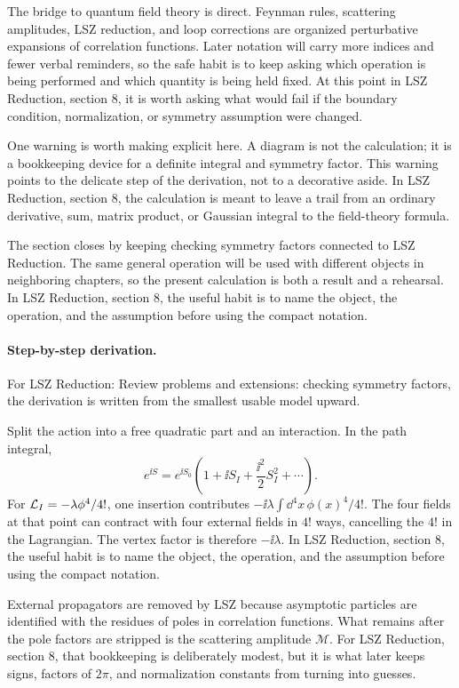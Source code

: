 The bridge to quantum field theory is direct.  Feynman rules, scattering amplitudes, LSZ reduction, and loop corrections are organized perturbative expansions of correlation functions.  Later notation will carry more indices and fewer verbal reminders, so the safe habit is to keep asking which operation is being performed and which quantity is being held fixed.  At this point in LSZ Reduction, section 8, it is worth asking what would fail if the boundary condition, normalization, or symmetry assumption were changed.

One warning is worth making explicit here.  A diagram is not the calculation; it is a bookkeeping device for a definite integral and symmetry factor.  This warning points to the delicate step of the derivation, not to a decorative aside.  In LSZ Reduction, section 8, the calculation is meant to leave a trail from an ordinary derivative, sum, matrix product, or Gaussian integral to the field-theory formula.

The section closes by keeping checking symmetry factors connected to LSZ Reduction.  The same general operation will be used with different objects in neighboring chapters, so the present calculation is both a result and a rehearsal.  In LSZ Reduction, section 8, the useful habit is to name the object, the operation, and the assumption before using the compact notation.



\paragraph{Step-by-step derivation.}

For LSZ Reduction: Review problems and extensions: checking symmetry factors, the derivation is written from the smallest usable model upward.

Split the action into a free quadratic part and an interaction.  In the path integral,
\[
  e^{\ii S}=e^{\ii S_0}\left(1+\ii S_I+\frac{\ii^2}{2}S_I^2+\cdots\right).
\]
For \(\mathcal L_I=-\lambda\phi^4/4!\), one insertion contributes \(-\ii\lambda\int\dd^4x\,\phi(x)^4/4!\).  The four fields at that point can contract with four external fields in \(4!\) ways, cancelling the \(4!\) in the Lagrangian.  The vertex factor is therefore \(-\ii\lambda\).  In LSZ Reduction, section 8, the useful habit is to name the object, the operation, and the assumption before using the compact notation.

External propagators are removed by LSZ because asymptotic particles are identified with the residues of poles in correlation functions.  What remains after the pole factors are stripped is the scattering amplitude \(\mathcal M\).  For LSZ Reduction, section 8, that bookkeeping is deliberately modest, but it is what later keeps signs, factors of \(2\pi\), and normalization constants from turning into guesses.

